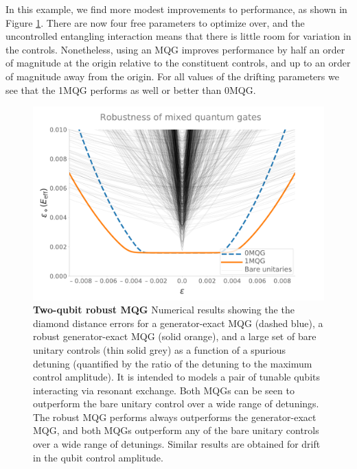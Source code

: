 \documentclass[aps,nofootinbib,pra,notitlepage,twocolumn]{revtex4-1}
\newcommand{\0}{\ensuremath{\mathbf{0}}}
\begin{document}
{In this example, we find more modest improvements to performance, as shown in Figure \ref{fig:2MQG}. There are now four free parameters to optimize over, and the uncontrolled entangling interaction means that there is little room for variation in the controls. Nonetheless, using an MQG improves performance by half an order of magnitude at the origin relative to the constituent controls, and up to an order of magnitude away from the origin. For all values of the drifting parameters we see that the 1MQG performs as well or better than 0MQG.

\begin{figure}
  \centering
  \includegraphics[width=\columnwidth]{figures/2q_robustness.pdf}
  \caption{\textbf{Two-qubit robust MQG} Numerical results showing the the diamond distance errors for a generator-exact MQG (dashed blue), a robust generator-exact MQG (solid orange), and a large set of bare unitary controls (thin solid grey) as a function of a spurious detuning (quantified by the ratio of the detuning to the maximum control amplitude). It is intended to models a pair of tunable qubits interacting via resonant exchange. Both MQGs can be seen to outperform the bare unitary control over a wide range of detunings. The robust MQG performs always outperforms the generator-exact MQG, and both MQGs outperform any of the bare unitary controls over a wide range of detunings. Similar results are obtained for drift in the qubit control amplitude.}
  \label{fig:2MQG}
\end{figure}








}
\end{document}
